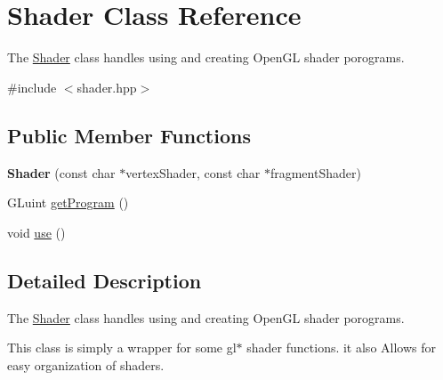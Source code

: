 \hypertarget{classShader}{\section{Shader Class Reference}
\label{classShader}
}


The \hyperlink{classShader}{Shader} class handles using and creating Open\+G\+L shader porograms.  




{\ttfamily \#include $<$shader.\+hpp$>$}

\subsection*{Public Member Functions}
\begin{DoxyCompactItemize}
\item 
\hypertarget{classShader_abda64528f1b4f9a251213185e426172e}{{\bfseries Shader} (const char $\ast$vertex\+Shader, const char $\ast$fragment\+Shader)}\label{classShader_abda64528f1b4f9a251213185e426172e}

\item 
G\+Luint \hyperlink{classShader_ab3b6ebf2670424320d518f417a676fc2}{get\+Program} ()
\item 
void \hyperlink{classShader_a870fa9f13d69e558815d6fd351a469dc}{use} ()
\end{DoxyCompactItemize}


\subsection{Detailed Description}
The \hyperlink{classShader}{Shader} class handles using and creating Open\+G\+L shader porograms. 

This class is simply a wrapper for some gl$\ast$ shader functions. it also Allows for easy organization of shaders. 

